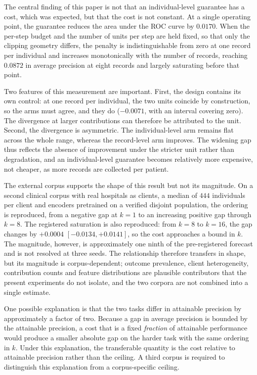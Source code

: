 The central finding of this paper is not that an individual-level guarantee
has a cost, which was expected, but that the cost is not constant. At a single
operating point, the guarantee reduces the area under the ROC curve by
$0.0170$. When the per-step budget and the number of units per step are held
fixed, so that only the clipping geometry differs, the penalty is
indistinguishable from zero at one record per individual and increases
monotonically with the number of records, reaching $0.0872$ in average
precision at eight records and largely saturating before that point.

Two features of this measurement are important. First, the design contains its
own control: at one record per individual, the two units coincide by
construction, so the arms must agree, and they do ($-0.0071$, with an interval
covering zero). The divergence at larger contributions can therefore be
attributed to the unit. Second, the divergence is asymmetric. The
individual-level arm remains flat across the whole range, whereas the
record-level arm improves. The widening gap thus reflects the absence of
improvement under the stricter unit rather than degradation, and an
individual-level guarantee becomes relatively more expensive, not cheaper, as
more records are collected per patient.

The external corpus supports the shape of this result but not its magnitude.
On a second clinical corpus with real hospitals as clients, a median of $444$
individuals per client and encoders pretrained on a verified disjoint
population, the ordering is reproduced, from a negative gap at $k = 1$ to an
increasing positive gap through $k = 8$. The registered saturation is also
reproduced: from $k = 8$ to $k = 16$, the gap changes by $+0.0004$
$[-0.0134, +0.0141]$, so the cost approaches a bound in $k$. The magnitude,
however, is approximately one ninth of the pre-registered forecast and is not
resolved at three seeds. The relationship therefore transfers in shape, but
its magnitude is corpus-dependent; outcome prevalence, client heterogeneity,
contribution counts and feature distributions are plausible contributors that
the present experiments do not isolate, and the two corpora are not combined
into a single estimate.

One possible explanation is that the two tasks differ in attainable precision
by approximately a factor of two. Because a gap in average precision is bounded
by the attainable precision, a cost that is a fixed \emph{fraction} of
attainable performance would produce a smaller absolute gap on the harder task
with the same ordering in $k$. Under this explanation, the transferable
quantity is the cost relative to attainable precision rather than the ceiling.
A third corpus is required to distinguish this explanation from a
corpus-specific ceiling.

